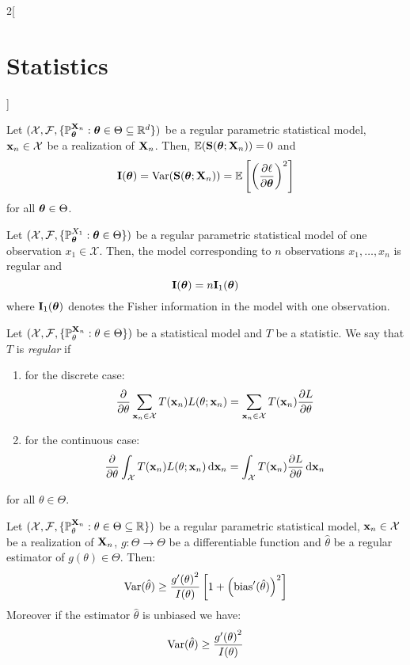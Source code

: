 \documentclass[../../../main_math.tex]{subfiles}
\begin{document}
\begin{multicols}{2}[\section{Statistics}]
  \begin{proposition}
    Let $(\mathcal{X},\mathcal{F},\{\mathbb{P}_{\boldsymbol{\mathrm{\theta}}}^{\boldsymbol{\mathrm{X}}_n}:\boldsymbol{\mathrm{\theta}}\in\Theta\subseteq\mathbb{R}^d\})$ be a regular parametric statistical model, $\boldsymbol{\mathrm{x}}_n\in\mathcal{X}$ be a realization of $\boldsymbol{\mathrm{X}}_n$. Then, $\mathbb{E}(\boldsymbol{\mathrm{S}}(\boldsymbol{\mathrm{\theta}};\boldsymbol{\mathrm{X}}_n))=0$ and $$\boldsymbol{\mathrm{I}}(\boldsymbol{\mathrm{\theta}})=\mathrm{Var}(\boldsymbol{\mathrm{S}}(\boldsymbol{\mathrm{\theta}};\boldsymbol{\mathrm{X}}_n))=\mathbb{E}\left[{\left(\pdv{\ell}{\boldsymbol{\mathrm{\theta}}}(\boldsymbol{\mathrm{\theta}};\boldsymbol{\mathrm{X}}_n)\right)}^2\right]$$
    for all $\boldsymbol{\mathrm{\theta}}\in\Theta$.
  \end{proposition}
  \begin{proposition}
    Let $(\mathcal{X},\mathcal{F},\{\mathbb{P}_{\boldsymbol{\mathrm{\theta}}}^{X_1}:\boldsymbol{\mathrm{\theta}}\in\Theta\})$ be a regular parametric statistical model of one observation $x_1\in \mathcal{X}$. Then, the model corresponding to $n$ \iid observations $x_1,\ldots,x_n$ is regular and $$\boldsymbol{\mathrm{I}}(\boldsymbol{\mathrm{\theta}})=n \boldsymbol{\mathrm{I}}_1(\boldsymbol{\mathrm{\theta}})$$
    where $\boldsymbol{\mathrm{I}}_1(\boldsymbol{\mathrm{\theta}})$ denotes the Fisher information in the model with one observation.
  \end{proposition}
  \begin{definition}
    Let $(\mathcal{X},\mathcal{F},\{\mathbb{P}_{\theta}^{\boldsymbol{\mathrm{X}}_n}:\theta\in\Theta\})$ be a statistical model and $T$ be a statistic. We say that $T$ is \emph{regular} if
    \begin{enumerate}
      \item for the discrete case: $$\pdv{}{\theta}\sum_{\boldsymbol{\mathrm{x}}_n\in\mathcal{X}}T(\boldsymbol{\mathrm{x}}_n)L(\theta;\boldsymbol{\mathrm{x}}_n)=\sum_{\boldsymbol{\mathrm{x}}_n\in\mathcal{X}}T(\boldsymbol{\mathrm{x}}_n)\pdv{L}{\theta}(\theta;\boldsymbol{\mathrm{x}}_n)$$
      \item for the continuous case: $$\pdv{}{\theta}\int_{\mathcal{X}}T(\boldsymbol{\mathrm{x}}_n)L(\theta;\boldsymbol{\mathrm{x}}_n)\dd{\boldsymbol{\mathrm{x}}_n}=\int_{\mathcal{X}}T(\boldsymbol{\mathrm{x}}_n)\pdv{L}{\theta}(\theta;\boldsymbol{\mathrm{x}}_n)\dd{\boldsymbol{\mathrm{x}}_n}$$
    \end{enumerate}
    for all $\theta\in\Theta$.
  \end{definition}
  \begin{theorem}
    Let $(\mathcal{X}, \mathcal{F}, \{\mathbb{P}_{\theta}^{\boldsymbol{\mathrm{X}}_n}: \theta\in\Theta\subseteq\mathbb{R}\})$ be a regular parametric statistical model, $\boldsymbol{\mathrm{x}}_n\in\mathcal{X}$ be a realization of $\boldsymbol{\mathrm{X}}_n$, $g:\Theta\rightarrow\Theta$ be a differentiable function and ${\hat\theta}$ be a regular estimator of $g({\theta})\in\Theta$. Then: $$\mathrm{Var}(\hat\theta)\geq \frac{{g'(\theta)}^2}{I(\theta) }\left[1+{\left(\operatorname{bias}'(\hat\theta)\right)}^2\right]$$ Moreover if the estimator $\hat\theta$ is unbiased we have: $$\mathrm{Var}(\hat\theta)\geq \frac{{g'(\theta)}^2}{I(\theta)}$$
  \end{theorem}

\end{multicols}
\end{document}
